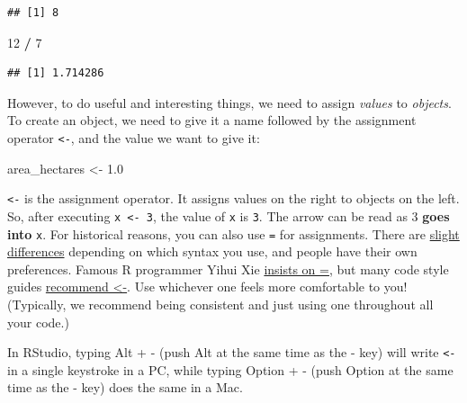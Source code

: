 \documentclass[]{book}
\newenvironment{Shaded}{\begin{snugshade}}{\end{snugshade}}
\newcommand{\DecValTok}[1]{\textcolor[rgb]{0.00,0.00,0.81}{#1}}
\newcommand{\FloatTok}[1]{\textcolor[rgb]{0.00,0.00,0.81}{#1}}
\newcommand{\StringTok}[1]{\textcolor[rgb]{0.31,0.60,0.02}{#1}}
\newcommand{\OperatorTok}[1]{\textcolor[rgb]{0.81,0.36,0.00}{\textbf{#1}}}
\newcommand{\NormalTok}[1]{#1}
\begin{document}
\begin{verbatim}
## [1] 8
\end{verbatim}

\begin{Shaded}
\begin{Highlighting}[]
\DecValTok{12} \OperatorTok{/}\StringTok{ }\DecValTok{7}
\end{Highlighting}
\end{Shaded}

\begin{verbatim}
## [1] 1.714286
\end{verbatim}

However, to do useful and interesting things, we need to assign
\emph{values} to \emph{objects}. To create an object, we need to give it
a name followed by the assignment operator \texttt{\textless{}-}, and
the value we want to give it:

\begin{Shaded}
\begin{Highlighting}[]
\NormalTok{area_hectares <-}\StringTok{ }\FloatTok{1.0}
\end{Highlighting}
\end{Shaded}

\texttt{\textless{}-} is the assignment operator. It assigns values on
the right to objects on the left. So, after executing
\texttt{x\ \textless{}-\ 3}, the value of \texttt{x} is \texttt{3}. The
arrow can be read as 3 \textbf{goes into} \texttt{x}. For historical
reasons, you can also use \texttt{=} for assignments. There are
\href{http://blog.revolutionanalytics.com/2008/12/use-equals-or-arrow-for-assignment.html}{slight}
\href{http://r.789695.n4.nabble.com/Is-there-any-difference-between-and-tp878594p878598.html}{differences}
depending on which syntax you use, and people have their own
preferences. Famous R programmer Yihui Xie
\href{https://yihui.org/en/2014/07/a-few-notes-on-user2014/}{insists on
=}, but many code style guides
\href{https://style.tidyverse.org/syntax.html\#assignment}{recommend
\textless{}-}. Use whichever one feels more comfortable to you!
(Typically, we recommend being consistent and just using one throughout
all your code.)

In RStudio, typing Alt + - (push Alt at the same time as the - key) will
write \texttt{\textless{}-} in a single keystroke in a PC, while typing
Option + - (push Option at the same time as the - key) does the same in
a Mac.
\end{document}
